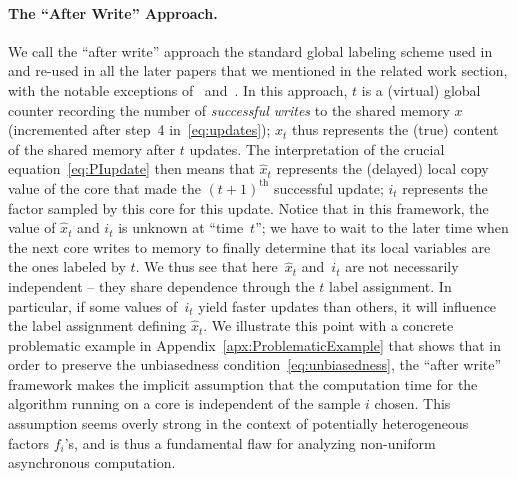 \documentclass[twoside]{article}
\begin{document}
\paragraph{The ``After Write'' Approach.} We call the ``after write'' approach the standard global labeling scheme used in~\citet{hogwild} and re-used in all the later papers that we mentioned in the related work section, with the notable exceptions of~\citet{mania} and~\citet{duchi}. In this approach, $t$ is a (virtual) global counter recording the number of \emph{successful writes} to the shared memory $x$ (incremented after step~4 in~\eqref{eq:updates}); $x_t$ thus represents the (true) content of the shared memory after $t$ updates. 
The interpretation of the crucial equation~\eqref{eq:PIupdate} then means that $\hat{x}_t$ represents the (delayed) local copy value of the core that made the $(t+1)^{\mathrm{th}}$ successful update; $i_t$ represents the factor sampled by this core for this update. 
Notice that in this framework, the value of $\hat x_t$ and $i_t$ is unknown at ``time~$t$''; we have to wait to the later time when the next core writes to memory to finally determine that its local variables are the ones labeled by $t$.
We thus see that here~$\hat x_t$ and~$i_t$ are not necessarily independent -- they share dependence through the $t$ label assignment. 
In particular, if some values of~$i_t$ yield faster updates than others, it will influence the label assignment defining $\hat x_t$. We illustrate this point with a concrete problematic example in Appendix~\ref{apx:ProblematicExample} that shows that in order to preserve the unbiasedness condition~\eqref{eq:unbiasedness}, the ``after write'' framework makes the implicit assumption that the computation time for the algorithm running on a core is independent of the sample $i$ chosen.
This assumption seems overly strong in the context of potentially heterogeneous factors $f_i$'s, and is thus a fundamental flaw for analyzing non-uniform asynchronous computation.

\vspace{-2mm}
\end{document}
